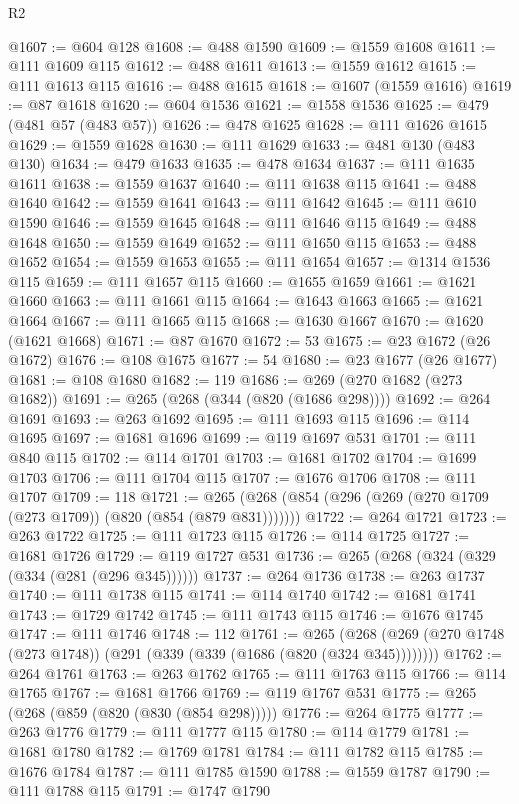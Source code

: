 \begin{lexlean}{R2}
\begin{coremodule}
{{{{{{{{{{{{{{{{{{{{{{{{{{{{{{{{{{{{{{{{{{{{{{{{{{{{{{{{{{{{{{{{{{{{{{{{{{{{{{{{{{{{{{{{{{{{{{{{{{{{{{{{{{{{{{{{{{{{{{{{{{{{{{{{{{{{{{{{{{{{@1607 := @604 @128
@1608 := @488 @1590
@1609 := @1559 @1608
@1611 := @111 @1609 @115
@1612 := @488 @1611
@1613 := @1559 @1612
@1615 := @111 @1613 @115
@1616 := @488 @1615
@1618 := @1607 (@1559 @1616)
@1619 := @87 @1618
@1620 := @604 @1536
@1621 := @1558 @1536
@1625 := @479 (@481 @57 (@483 @57))
@1626 := @478 @1625
@1628 := @111 @1626 @1615
@1629 := @1559 @1628
@1630 := @111 @1629
@1633 := @481 @130 (@483 @130)
@1634 := @479 @1633
@1635 := @478 @1634
@1637 := @111 @1635 @1611
@1638 := @1559 @1637
@1640 := @111 @1638 @115
@1641 := @488 @1640
@1642 := @1559 @1641
@1643 := @111 @1642
@1645 := @111 @610 @1590
@1646 := @1559 @1645
@1648 := @111 @1646 @115
@1649 := @488 @1648
@1650 := @1559 @1649
@1652 := @111 @1650 @115
@1653 := @488 @1652
@1654 := @1559 @1653
@1655 := @111 @1654
@1657 := @1314 @1536 @115
@1659 := @111 @1657 @115
@1660 := @1655 @1659
@1661 := @1621 @1660
@1663 := @111 @1661 @115
@1664 := @1643 @1663
@1665 := @1621 @1664
@1667 := @111 @1665 @115
@1668 := @1630 @1667
@1670 := @1620 (@1621 @1668)
@1671 := @87 @1670
@1672 := 53
@1675 := @23 @1672 (@26 @1672)
@1676 := @108 @1675
@1677 := 54
@1680 := @23 @1677 (@26 @1677)
@1681 := @108 @1680
@1682 := 119
@1686 := @269 (@270 @1682 (@273 @1682))
@1691 := @265 (@268 (@344 (@820 (@1686 @298))))
@1692 := @264 @1691
@1693 := @263 @1692
@1695 := @111 @1693 @115
@1696 := @114 @1695
@1697 := @1681 @1696
@1699 := @119 @1697 @531
@1701 := @111 @840 @115
@1702 := @114 @1701
@1703 := @1681 @1702
@1704 := @1699 @1703
@1706 := @111 @1704 @115
@1707 := @1676 @1706
@1708 := @111 @1707
@1709 := 118
@1721 := @265 (@268 (@854 (@296 (@269 (@270 @1709 (@273 @1709)) (@820 (@854 (@879 @831)))))))
@1722 := @264 @1721
@1723 := @263 @1722
@1725 := @111 @1723 @115
@1726 := @114 @1725
@1727 := @1681 @1726
@1729 := @119 @1727 @531
@1736 := @265 (@268 (@324 (@329 (@334 (@281 (@296 @345))))))
@1737 := @264 @1736
@1738 := @263 @1737
@1740 := @111 @1738 @115
@1741 := @114 @1740
@1742 := @1681 @1741
@1743 := @1729 @1742
@1745 := @111 @1743 @115
@1746 := @1676 @1745
@1747 := @111 @1746
@1748 := 112
@1761 := @265
    (@268 (@269 (@270 @1748 (@273 @1748)) (@291 (@339 (@339 (@1686 (@820 (@324 @345))))))))
@1762 := @264 @1761
@1763 := @263 @1762
@1765 := @111 @1763 @115
@1766 := @114 @1765
@1767 := @1681 @1766
@1769 := @119 @1767 @531
@1775 := @265 (@268 (@859 (@820 (@830 (@854 @298)))))
@1776 := @264 @1775
@1777 := @263 @1776
@1779 := @111 @1777 @115
@1780 := @114 @1779
@1781 := @1681 @1780
@1782 := @1769 @1781
@1784 := @111 @1782 @115
@1785 := @1676 @1784
@1787 := @111 @1785 @1590
@1788 := @1559 @1787
@1790 := @111 @1788 @115
@1791 := @1747 @1790
}}}}}}}}}}}}}}}}}}}}}}}}}}}}}}}}}}}}}}}}}}}}}}}}}}}}}}}}}}}}}}}}}}}}}}}}}}}}}}}}}}}}}}}}}}}}}}}}}}}}}}}}}}}}}}}}}}}}}}}}}}}}}}}}}}}}}}}}}}}}
\end{coremodule}
\end{lexlean}
